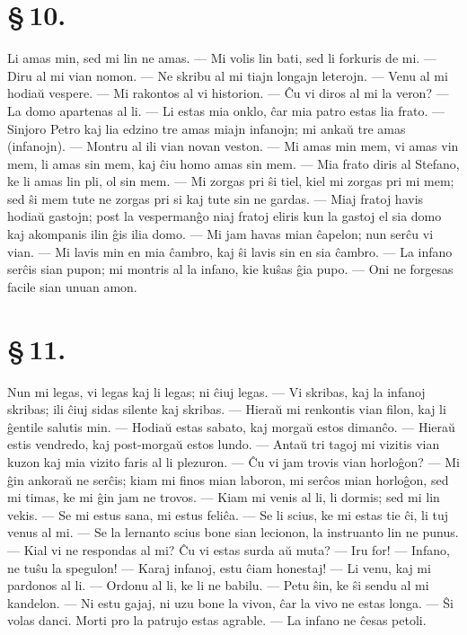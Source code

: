 \section*{\S\,10.}
Li amas min, sed mi lin ne amas. --- Mi volis lin bati, sed li
forkuris de mi. --- Diru al mi vian nomon. --- Ne skribu al mi tiajn
longajn leterojn. --- Venu al mi hodia\u u vespere. --- Mi rakontos
al vi historion. --- \^Cu vi diros al mi la veron? --- La domo
apartenas al li. --- Li estas mia onklo, \^car mia patro estas lia
frato. --- Sinjoro Petro kaj lia edzino tre amas miajn infanojn; mi
anka\u u tre amas (infanojn). --- Montru al ili vian novan veston.
--- Mi amas min mem, vi amas vin mem, li amas sin mem, kaj \^ciu
homo amas sin mem. --- Mia frato diris al Stefano, ke li amas lin
pli, ol sin mem. --- Mi zorgas pri \^si tiel, kiel mi zorgas pri mi
mem; sed \^si mem tute ne zorgas pri si kaj tute sin ne gardas.
--- Miaj fratoj havis hodia\u u gastojn; post la vesperman\^go niaj
fratoj eliris kun la gastoj el sia domo kaj akompanis ilin \^gis
ilia domo. --- Mi jam havas mian \^capelon; nun ser\^cu vi vian.
--- Mi lavis min en mia \^cambro, kaj \^si lavis sin en sia
\^cambro. --- La infano ser\^cis sian pupon; mi montris al la
infano, kie ku\^sas \^gia pupo. --- Oni ne forgesas facile sian
unuan amon.

\section*{\S\,11.}
Nun mi legas, vi legas kaj li legas; ni \^ciuj legas. --- Vi
skribas, kaj la infanoj skribas; ili \^ciuj sidas silente kaj
skribas. --- Hiera\u u mi renkontis vian filon, kaj li \^gentile
salutis min. --- Hodia\u u estas sabato, kaj morga\u u estos
diman\^co. --- Hiera\u u estis vendredo, kaj post-morga\u u estos
lundo. --- Anta\u u tri tagoj mi vizitis vian kuzon kaj mia vizito
faris al li plezuron. --- \^Cu vi jam trovis vian horlo\^gon? --- Mi
\^gin ankora\u u ne ser\^cis; kiam mi finos mian laboron, mi
ser\^cos mian horlo\^gon, sed mi timas, ke mi \^gin jam ne trovos.
--- Kiam mi venis al li, li dormis; sed mi lin vekis. --- Se mi estus
sana, mi estus feli\^ca. --- Se li scius, ke mi estas tie \^ci, li
tuj venus al mi. --- Se la lernanto scius bone sian lecionon, la
instruanto lin ne punus. --- Kial vi ne respondas al mi? \^Cu vi
estas surda a\u u muta? --- Iru for! --- Infano, ne tu\^su la
spegulon! --- Karaj infanoj, estu \^ciam honestaj! --- Li venu, kaj
mi pardonos al li. --- Ordonu al li, ke li ne babilu. --- Petu
\^sin, ke \^si sendu al mi kandelon. --- Ni estu gajaj, ni uzu bone
la vivon, \^car la vivo ne estas longa. --- \^Si volas danci. Morti
pro la patrujo estas agrable. --- La infano ne \^cesas petoli.

